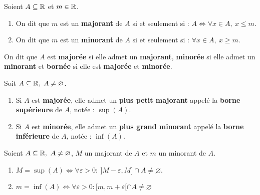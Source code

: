 \begin{definition}
    Soient $A \subseteq \mathbb{R}$ et $m \in \mathbb{R}$.
    \begin{enumerate}
        \item On dit que $m$ est un \textbf{majorant} de $A$ si et seulement si : $A \iff \forall x \in A,\ x \leq m$.
        \item On dit que $m$ est un \textbf{minorant} de $A$ si et seulement si : $\forall x \in A,\ x \geq m$.
    \end{enumerate}
    On dit que $A$ est \textbf{majorée} si elle admet un \textbf{majorant}, \textbf{minorée} si elle admet un \textbf{minorant} et \textbf{bornée} si elle est \textbf{majorée} et \textbf{minorée}.
\end{definition}

\begin{theorem}
    Soit $A \subseteq \mathbb{R},\ A \neq \varnothing$. 
    \begin{enumerate}
    	\item Si $A$ est \textbf{majorée}, elle admet un \textbf{plus petit majorant} appelé la \textbf{borne supérieure} de $A$, notée : $\sup(A)$.
    	\item Si $A$ est \textbf{minorée}, elle admet un \textbf{plus grand minorant} appelé la \textbf{borne inférieure} de $A$, notée : $\inf(A)$.
    \end{enumerate}
\end{theorem}

\begin{proposition}
    Soient $A \subseteq \mathbb{R},\ A \neq \varnothing$, $M$ un majorant de $A$ et $m$ un minorant de $A$.  
    \begin{enumerate}
        \item $M = \sup(A) \iff \forall \varepsilon > 0 : \ ]M - \varepsilon, M] \cap A \neq \varnothing$.
        \item $m = \inf(A) \iff \forall \varepsilon > 0 : [m, m + \varepsilon[ \cap A \neq \varnothing $
    \end{enumerate}
\end{proposition}